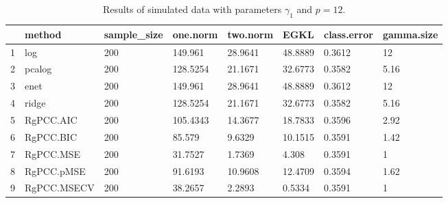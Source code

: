 \begin{table}[ht]
\centering
\begin{tabular}{rlllllll}
  \hline
 & method & sample\_size & one.norm & two.norm & EGKL & class.error & gamma.size \\ 
  \hline
1 & log & 200 & 149.961 & 28.9641 & 48.8889 & 0.3612 & 12 \\ 
  2 & pcalog & 200 & 128.5254 & 21.1671 & 32.6773 & 0.3582 & 5.16 \\ 
  3 & enet & 200 & 149.961 & 28.9641 & 48.8889 & 0.3612 & 12 \\ 
  4 & ridge & 200 & 128.5254 & 21.1671 & 32.6773 & 0.3582 & 5.16 \\ 
  5 & RgPCC.AIC & 200 & 105.4343 & 14.3677 & 18.7833 & 0.3596 & 2.92 \\ 
  6 & RgPCC.BIC & 200 & 85.579 & 9.6329 & 10.1515 & 0.3591 & 1.42 \\ 
  7 & RgPCC.MSE & 200 & 31.7527 & 1.7369 & 4.308 & 0.3591 & 1 \\ 
  8 & RgPCC.pMSE & 200 & 91.6193 & 10.9608 & 12.4709 & 0.3594 & 1.62 \\ 
  9 & RgPCC.MSECV & 200 & 38.2657 & 2.2893 & 0.5334 & 0.3591 & 1 \\ 
   \hline
\end{tabular}
\caption{Results of simulated data with parameters $\gamma_1$ and $p =12$. } 
\label{fig-1-200-lead-12-metrics-p}
\end{table}
